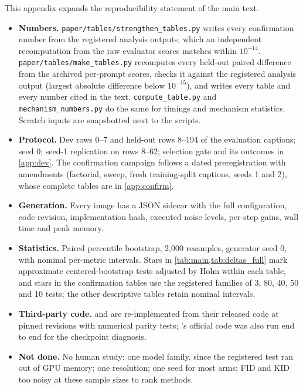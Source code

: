 This appendix expands the reproducibility statement of the main text.
\begin{itemize}
\item \textbf{Numbers.} \texttt{paper/tables/strengthen\_tables.py} writes every confirmation number from the registered analysis outputs, which an independent recomputation from the raw evaluator scores matches within $10^{-14}$. \texttt{paper/tables/make\_tables.py} recomputes every held-out paired difference from the archived per-prompt scores, checks it against the registered analysis output (largest absolute difference below $10^{-15}$), and writes every table and every number cited in the text. \texttt{compute\_table.py} and \texttt{mechanism\_numbers.py} do the same for timings and mechanism statistics. Scratch inputs are snapshotted next to the scripts.
\item \textbf{Protocol.} Dev rows 0--7 and held-out rows 8--194 of the \afk{} evaluation captions; seed 0; seed-1 replication on rows 8--62; selection gate and its outcomes in \cref{app:dev}. The confirmation campaign follows a dated preregistration with amendments (factorial, sweep,  fresh training-split captions, seeds 1 and 2), whose complete tables are in \cref{app:confirm}.
\item \textbf{Generation.} Every image has a JSON sidecar with the full configuration, code revision, implementation hash, executed noise levels, per-step gains, wall time and peak memory.
\item \textbf{Statistics.} Paired percentile bootstrap, 2,000 resamples, generator seed 0, with nominal per-metric intervals. Stars in \cref{tab:main,tab:deltas_full} mark approximate centered-bootstrap tests adjusted by Holm within each table, and stars in the confirmation tables use the registered families of 3, 80, 40, 50 and 10 tests; the other descriptive tables retain nominal intervals.
\item \textbf{Third-party code.} \sega{} and \dype{} are re-implemented from their released code at pinned revisions with numerical parity tests; \dype{}'s official code was also run end to end for the checkpoint diagnosis.
\item \textbf{Not done.} No human study; one model family, since the registered \qwen{} test ran out of GPU memory; one resolution; one seed for most arms; FID and KID too noisy at these sample sizes to rank methods.
\end{itemize}
